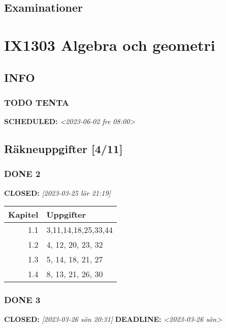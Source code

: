 \documentclass[11pt]{article}
\begin{document}
\subsection{Examinationer}
\label{sec:org89bbd36}

\section{IX1303 Algebra och geometri}
\label{sec:org98459ae}

\subsection{INFO}
\label{sec:org4319149}

\subsubsection{{\bfseries\sffamily TODO} TENTA}
\label{sec:org5cdf189}
\noindent\textbf{SCHEDULED:} \textit{<2023-06-02 fre 08:00>}\\[0pt]

\subsection{Räkneuppgifter [4/11]}
\label{sec:orga4e8b14}
\subsubsection{{\bfseries\sffamily DONE} 2}
\label{sec:orgb715c8e}
\noindent\textbf{CLOSED:} \textit{[2023-03-25 lör 21:19]}\\[0pt]
\begin{center}
\begin{tabular}{rl}
Kapitel & Uppgifter\\[0pt]
\hline
1.1 & 3,11,14,18,25,33,44\\[0pt]
1.2 & 4, 12, 20, 23, 32\\[0pt]
1.3 & 5, 14, 18, 21, 27\\[0pt]
1.4 & 8, 13, 21, 26, 30\\[0pt]
\end{tabular}
\end{center}

\subsubsection{{\bfseries\sffamily DONE} 3}
\label{sec:org17e4224}
\noindent\textbf{CLOSED:} \textit{[2023-03-26 sön 20:31] } \textbf{DEADLINE:} \textit{<2023-03-26 sön>}\\[0pt]
\end{document}
